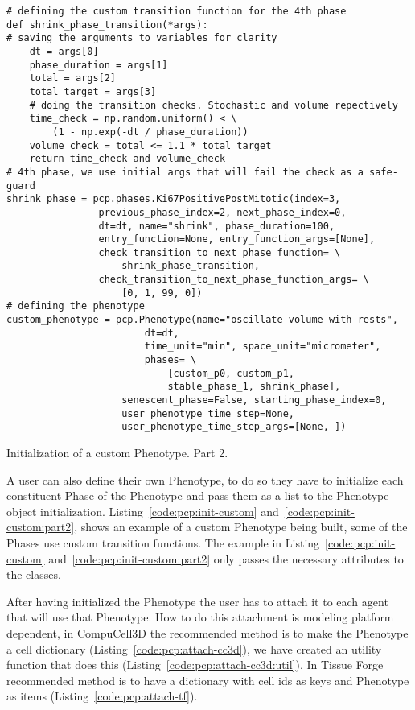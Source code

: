 \begin{listing}[H]
\begin{verbatim}
# defining the custom transition function for the 4th phase
def shrink_phase_transition(*args):
# saving the arguments to variables for clarity
    dt = args[0]
    phase_duration = args[1]
    total = args[2]
    total_target = args[3]
    # doing the transition checks. Stochastic and volume repectively
    time_check = np.random.uniform() < \ 
        (1 - np.exp(-dt / phase_duration))
    volume_check = total <= 1.1 * total_target
    return time_check and volume_check
# 4th phase, we use initial args that will fail the check as a safe-guard
shrink_phase = pcp.phases.Ki67PositivePostMitotic(index=3, 
                previous_phase_index=2, next_phase_index=0, 
                dt=dt, name="shrink", phase_duration=100,
                entry_function=None, entry_function_args=[None], 
                check_transition_to_next_phase_function= \
                    shrink_phase_transition,
                check_transition_to_next_phase_function_args= \
                    [0, 1, 99, 0])
# defining the phenotype
custom_phenotype = pcp.Phenotype(name="oscillate volume with rests", 
                        dt=dt, 
                        time_unit="min", space_unit="micrometer", 
                        phases= \
                            [custom_p0, custom_p1, 
                            stable_phase_1, shrink_phase], 
                    senescent_phase=False, starting_phase_index=0,
                    user_phenotype_time_step=None,
                    user_phenotype_time_step_args=[None, ])
\end{verbatim}
\caption{Initialization of a custom Phenotype. Part 2.}\label{code:pcp:init-custom:part2}
\end{listing}


A user can also define their own Phenotype, to do so they have to initialize each constituent Phase of the Phenotype and pass them as a list to the Phenotype object initialization. Listing~\ref{code:pcp:init-custom} and~\ref{code:pcp:init-custom:part2}, shows an example of a custom Phenotype being built, some of the Phases use custom transition functions. The example in Listing~\ref{code:pcp:init-custom} and~\ref{code:pcp:init-custom:part2} only passes the necessary attributes to the classes.

After having initialized the Phenotype the user has to attach it to each agent that will use that Phenotype. How to do this attachment is modeling platform dependent, in CompuCell3D the recommended method is to make the Phenotype a cell dictionary (Listing~\ref{code:pcp:attach-cc3d}), we have created an utility function that does this (Listing~\ref{code:pcp:attach-cc3d:util}). In Tissue Forge recommended method is to have a dictionary with cell ids as keys and Phenotype as items (Listing~\ref{code:pcp:attach-tf}).

